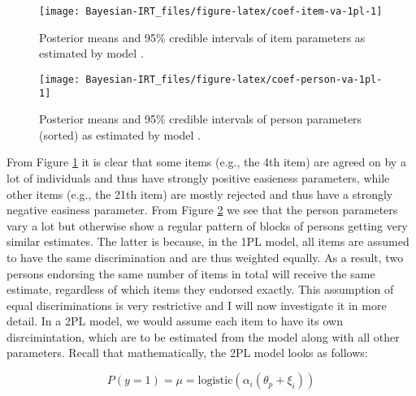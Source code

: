 \documentclass[jss]{jss}
\begin{document}
\begin{CodeChunk}
\begin{figure}

{\centering \texttt{[image: Bayesian-IRT\_files/figure-latex/coef-item-va-1pl-1]} 

}

\caption[Posterior means and 95\% credible intervals of item parameters as estimated by model ]{Posterior means and 95\% credible intervals of item parameters as estimated by model .}\label{fig:coef-item-va-1pl}
\end{figure}
\end{CodeChunk}

\begin{CodeChunk}
\begin{figure}

{\centering \texttt{[image: Bayesian-IRT\_files/figure-latex/coef-person-va-1pl-1]} 

}

\caption[Posterior means and 95\% credible intervals of person parameters (sorted) as estimated by model ]{Posterior means and 95\% credible intervals of person parameters (sorted) as estimated by model .}\label{fig:coef-person-va-1pl}
\end{figure}
\end{CodeChunk}

From Figure \ref{fig:coef-item-va-1pl} it is clear that some items
(e.g., the 4th item) are agreed on by a lot of individuals and thus have
strongly positive easieness parameters, while other items (e.g., the
21th item) are mostly rejected and thus have a strongly negative
easiness parameter. From Figure \ref{fig:coef-person-va-1pl} we see that
the person parameters vary a lot but otherwise show a regular pattern of
blocks of persons getting very similar estimates. The latter is because,
in the 1PL model, all items are assumed to have the same discrimination
and are thus weighted equally. As a result, two persons endorsing the
same number of items in total will receive the same estimate, regardless
of which items they endorsed exactly. This assumption of equal
discriminations is very restrictive and I will now investigate it in
more detail. In a 2PL model, we would assume each item to have its own
disrcimintation, which are to be estimated from the model along with all
other parameters. Recall that mathematically, the 2PL model looks as
follows:

\[
P(y = 1) = \mu = \text{logistic}(\alpha_i (\theta_p + \xi_i))
\]
\end{document}
